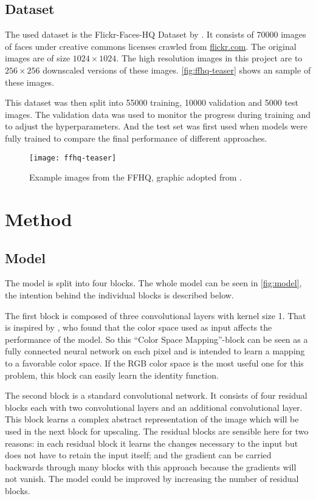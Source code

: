 \documentclass{scrartcl}
\begin{document}
\subsection{Dataset}

The used dataset is the Flickr-Faces-HQ Dataset by \textcite{style_gan}.
It consists of \num{70000} images of faces under creative commons licenses crawled from \href{https://www.flickr.com}{flickr.com}.
The original images are of size \( \num{1024} \times \num{1024} \).
The high resolution images in this project are to \( \num{256} \times \num{256} \) downscaled versions of these images.
\autoref{fig:ffhq-teaser} shows an sample of these images.

This dataset was then split into \num{55000} training, \num{10000} validation and \num{5000} test images.
The validation data was used to monitor the progress during training and to adjust the hyperparameters.
And the test set was first used when models were fully trained to compare the final performance of different approaches.

\begin{figure}
	\texttt{[image: ffhq-teaser]}
	\caption{Example images from the FFHQ, graphic adopted from \textcite{style_gan}.}
	\label{fig:ffhq-teaser}
\end{figure} 

\section{Method}

\subsection{Model}
The model is split into four blocks. The whole model can be seen in \autoref{fig:model}, the intention behind the individual blocks is described below.

The first block is composed of three convolutional layers with kernel size 1.
That is inspired by \textcite{color_net}, who found that the color space used as input affects the performance of the model.  
So this \enquote{Color Space Mapping}-block can be seen as a fully connected neural network on each pixel and is intended to learn a mapping to a favorable color space.
If the RGB color space is the most useful one for this problem, this block can easily learn the identity function.

The second block is a standard convolutional network.
It consists of four residual blocks each with two convolutional layers and an additional convolutional layer.
This block learns a complex abstract representation of the image which will be used in the next block for upscaling.
The residual blocks are sensible here for two reasons: in each residual block it learns the changes necessary to the input but does not have to retain the input itself; and the gradient can be carried backwards through many blocks with this approach because the gradients will not vanish.
The model could be improved by increasing the number of residual blocks.
\end{document}
